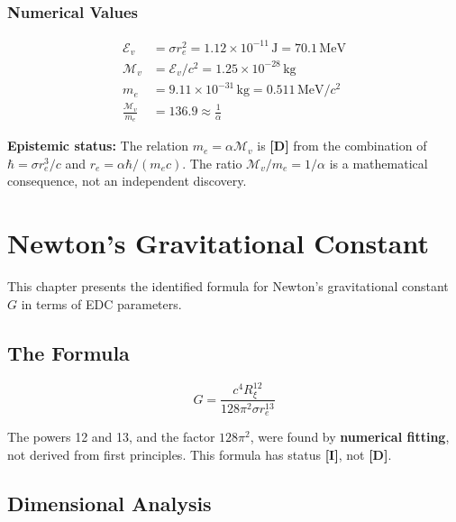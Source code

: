 \documentclass[12pt,a4paper,openany]{book}
\theoremstyle{definition}
\theoremstyle{plain}
\theoremstyle{remark}
\newcommand{\Mv}{\mathcal{M}_v}           %
\newcommand{\Ev}{\mathcal{E}_v}           %
\newcommand{\re}{r_e}                      %
\newcommand{\Rxi}{R_\xi}                   %
\newcommand{\derived}{\textcolor{derivedcolor}{\textbf{[D]}}}
\newcommand{\identified}{\textcolor{identifiedcolor}{\textbf{[I]}}}
\begin{document}
\subsection{Numerical Values}

\begin{align}
\Ev &= \sigma \re^2 = 1.12 \times 10^{-11}\,\text{J} = 70.1\,\text{MeV} \\
\Mv &= \Ev/c^2 = 1.25 \times 10^{-28}\,\text{kg} \\
m_e &= 9.11 \times 10^{-31}\,\text{kg} = 0.511\,\text{MeV}/c^2 \\
\frac{\Mv}{m_e} &= 136.9 \approx \frac{1}{\alpha}
\end{align}

\textbf{Epistemic status:} The relation $m_e = \alpha \Mv$ is \derived{} from the combination of $\hbar = \sigma\re^3/c$ and $\re = \alpha\hbar/(m_e c)$. The ratio $\Mv/m_e = 1/\alpha$ is a mathematical consequence, not an independent discovery.

\chapter{Newton's Gravitational Constant}

This chapter presents the identified formula for Newton's gravitational constant $G$ in terms of EDC parameters.

\section{The Formula}

\begin{identifiedbox}
\begin{equation}
\boxed{G = \frac{c^4 \Rxi^{12}}{128\pi^2 \sigma \re^{13}}}
\label{eq:G_edc}
\end{equation}
\end{identifiedbox}

\begin{warningbox}
The powers 12 and 13, and the factor $128\pi^2$, were found by \textbf{numerical fitting}, not derived from first principles. This formula has status \identified{}, not \derived{}.
\end{warningbox}

\section{Dimensional Analysis}
\end{document}
